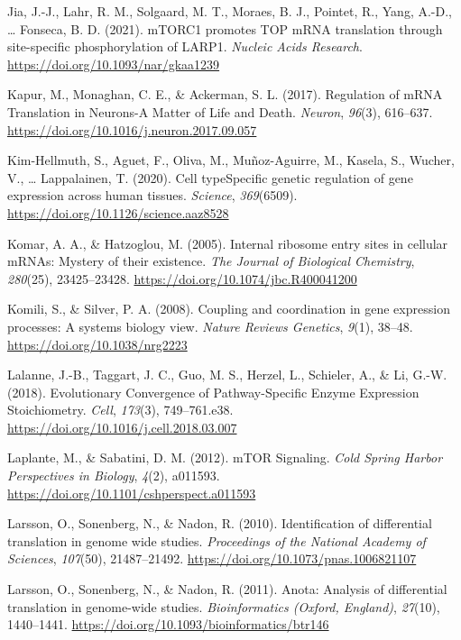 \documentclass[12pt,openany]{book}
\begin{document}
\hypertarget{ref-Jia2021}{}
Jia, J.-J., Lahr, R. M., Solgaard, M. T., Moraes, B. J., Pointet, R.,
Yang, A.-D., \ldots{} Fonseca, B. D. (2021). mTORC1 promotes TOP mRNA
translation through site-specific phosphorylation of LARP1.
\emph{Nucleic Acids Research}.
\url{https://doi.org/10.1093/nar/gkaa1239}

\hypertarget{ref-Kapur2017}{}
Kapur, M., Monaghan, C. E., \& Ackerman, S. L. (2017). Regulation of
mRNA Translation in Neurons-A Matter of Life and Death. \emph{Neuron},
\emph{96}(3), 616--637.
\url{https://doi.org/10.1016/j.neuron.2017.09.057}

\hypertarget{ref-Kim-Hellmuth2020}{}
Kim-Hellmuth, S., Aguet, F., Oliva, M., Muñoz-Aguirre, M., Kasela, S.,
Wucher, V., \ldots{} Lappalainen, T. (2020). Cell typeSpecific genetic
regulation of gene expression across human tissues. \emph{Science},
\emph{369}(6509). \url{https://doi.org/10.1126/science.aaz8528}

\hypertarget{ref-Komar2005}{}
Komar, A. A., \& Hatzoglou, M. (2005). Internal ribosome entry sites in
cellular mRNAs: Mystery of their existence. \emph{The Journal of
Biological Chemistry}, \emph{280}(25), 23425--23428.
\url{https://doi.org/10.1074/jbc.R400041200}

\hypertarget{ref-Komili2008}{}
Komili, S., \& Silver, P. A. (2008). Coupling and coordination in gene
expression processes: A systems biology view. \emph{Nature Reviews
Genetics}, \emph{9}(1), 38--48. \url{https://doi.org/10.1038/nrg2223}

\hypertarget{ref-Lalanne2018}{}
Lalanne, J.-B., Taggart, J. C., Guo, M. S., Herzel, L., Schieler, A., \&
Li, G.-W. (2018). Evolutionary Convergence of Pathway-Specific Enzyme
Expression Stoichiometry. \emph{Cell}, \emph{173}(3), 749--761.e38.
\url{https://doi.org/10.1016/j.cell.2018.03.007}

\hypertarget{ref-Laplante2012}{}
Laplante, M., \& Sabatini, D. M. (2012). mTOR Signaling. \emph{Cold
Spring Harbor Perspectives in Biology}, \emph{4}(2), a011593.
\url{https://doi.org/10.1101/cshperspect.a011593}

\hypertarget{ref-Larsson2010}{}
Larsson, O., Sonenberg, N., \& Nadon, R. (2010). Identification of
differential translation in genome wide studies. \emph{Proceedings of
the National Academy of Sciences}, \emph{107}(50), 21487--21492.
\url{https://doi.org/10.1073/pnas.1006821107}

\hypertarget{ref-Larsson2011}{}
Larsson, O., Sonenberg, N., \& Nadon, R. (2011). Anota: Analysis of
differential translation in genome-wide studies. \emph{Bioinformatics
(Oxford, England)}, \emph{27}(10), 1440--1441.
\url{https://doi.org/10.1093/bioinformatics/btr146}
\end{document}
